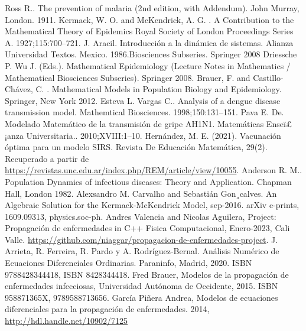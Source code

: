\documentclass[journal]{IEEEtran}
\begin{document}
\begin{thebibliography}{1}

	Ross R.. The prevention of malaria (2nd edition, with Addendum). John
	Murray, London. 1911.
	Kermack, W. O. and McKendrick, A. G. . A Contribution to the
	Mathematical Theory of Epidemics
	Royal Society of London Proceedings Series A. 1927;115:700–721.
	J. Aracil. Introducción a la dinámica de sistemas. Alianza Universidad Textos.
	Mexico. 1986.Biosciences Subseries. Springer 2008
	Driessche P. Wu J. (Eds.). Mathematical Epidemiology (Lecture Notes in
	Mathematics / Mathematical
	Biosciences Subseries). Springer 2008.
	Brauer, F. and Castillo-Chávez, C. . Mathematical Models in Population
	Biology and Epidemiology.
	Springer, New York 2012.
	Esteva L. Vargas C.. Analysis of a dengue disease transmission model.
	Mathemtical Biosciences.
	1998;150:131–151.
	Pava E. De. Modelado Matemático de la transmisión de gripe AH1N1.
	Matemáticas Enseï£¡anza
	Universitaria.. 2010;XVIII:1–10.
	Hernández, M. E. (2021). Vacunación óptima para un modelo SIRS. Revista
	De Educación Matemática, 29(2).
	Recuperado a partir de
	\url{https://revistas.unc.edu.ar/index.php/REM/article/view/10055}.
	Anderson R. M.. Population Dynamics of infectious diseases: Theory and
	Application. Chapman
	Hall, London 1982.
	Alexsandro M. Carvalho and Sebastián Gon¸calves. An Algebraic Solution
	for the Kermack-McKendrick Model, sep-2016.
	arXiv e-prints, 1609.09313, physics.soc-ph.
	Andres Valencia and Nicolas Aguilera, Project: Propagación de
	enfermedades in C++
	Fisica Computacional, Enero-2023, Cali Valle.
	\url{https://github.com/niaggar/propagacion-de-enfermedades-project}.
	J. Arrieta, R. Ferreira, R. Pardo y A. Rodríguez-Bernal. Análisis Numérico
	de Ecuaciones Diferenciales Ordinarias.
	Paraninfo, Madrid, 2020. ISBN 9788428344418, ISBN 8428344418.
	Fred Brauer, Modelos de la propagación de enfermedades infecciosas,
	Universidad Autónoma de Occidente, 2015. ISBN	958871365X, 9789588713656.
  García Piñera Andrea, Modelos de ecuaciones diferenciales para la propagación de enfermedades.
  2014, \url{http://hdl.handle.net/10902/7125}
\end{thebibliography}
\end{document}
